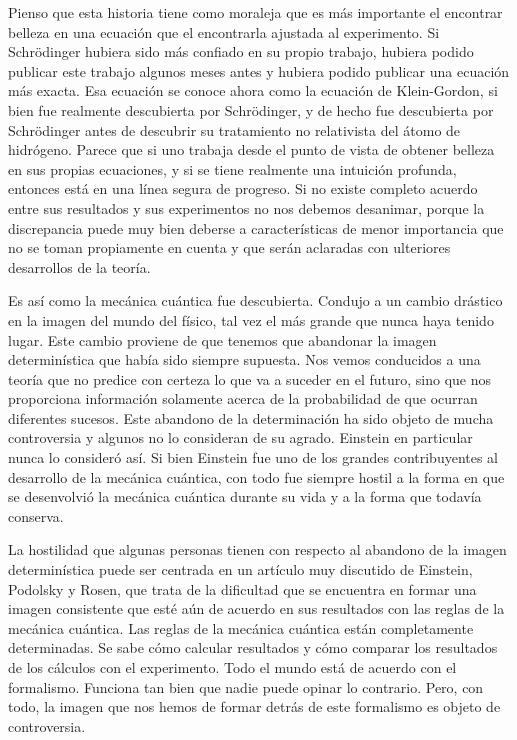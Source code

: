\documentclass[a4paper, 12pt]{article}
\begin{document}
Pienso que esta historia tiene como moraleja  que es más importante el encontrar belleza en una ecuación que el encontrarla ajustada al experimento. Si Schrödinger hubiera sido más confiado en su propio trabajo, hubiera podido publicar este trabajo algunos meses antes y hubiera podido publicar una ecuación más exacta. Esa ecuación se conoce ahora como la ecuación de Klein-Gordon, si bien fue realmente descubierta por Schrödinger, y de hecho fue descubierta por Schrödinger antes de descubrir su tratamiento no relativista del átomo de hidrógeno. Parece que si uno trabaja desde el punto de vista de obtener belleza en sus propias ecuaciones, y si se tiene realmente una intuición profunda, entonces está en una línea segura de progreso. Si no existe completo acuerdo entre sus resultados y sus experimentos no nos debemos  desanimar, porque la discrepancia puede muy bien deberse a características de menor importancia que no se toman propiamente en cuenta y que serán aclaradas con ulteriores desarrollos de la teoría.


Es así como la mecánica cuántica fue descubierta. Condujo a un cambio drástico en la imagen del mundo del físico, tal vez el más grande que nunca haya tenido lugar. Este cambio proviene de que tenemos que abandonar la imagen determinística que había sido siempre supuesta. Nos vemos conducidos a una teoría que no predice con certeza lo que va a suceder en el futuro, sino que nos proporciona información solamente acerca de la probabilidad de que ocurran diferentes sucesos. Este abandono de la determinación ha sido objeto de mucha controversia y algunos no lo consideran de su agrado. Einstein en particular nunca lo consideró así. Si bien Einstein fue uno de los grandes contribuyentes al desarrollo de la mecánica cuántica, con todo fue siempre hostil a la forma en que se desenvolvió la mecánica cuántica durante su vida y a la forma que todavía conserva.

La hostilidad que algunas personas tienen con respecto al abandono de la imagen determinística puede ser centrada en un artículo muy discutido de Einstein, Podolsky y Rosen, que trata de la dificultad que se encuentra en formar una imagen consistente que esté aún de acuerdo en sus resultados con las reglas de la mecánica cuántica. Las reglas de la mecánica cuántica están completamente determinadas. Se sabe cómo calcular resultados y cómo comparar los resultados de los cálculos con el experimento. Todo el mundo está de acuerdo con el formalismo. Funciona tan bien que nadie  puede opinar lo contrario. Pero, con todo, la imagen que nos hemos de formar detrás de este formalismo es objeto de controversia.
\end{document}
